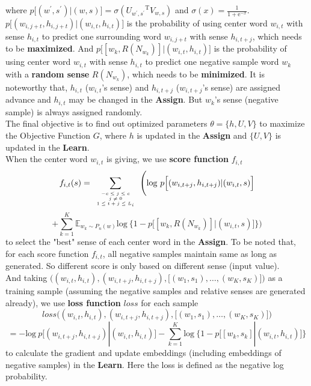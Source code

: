 \documentclass[12pt,a4paper,twoside]{book}
\begin{document}
where $p\Big[(w^\prime,s^\prime)|(w,s)\Big] = \sigma({U_{w^\prime,s^\prime}}^{\mathrm{T}}V_{w,s})$
 and $\sigma(x) = \frac{1}{1+\mathrm{e}^{-x}}$. \\
 
 $p\Big [(w_{i,j+t},h_{i,j+t})|(w_{i,t},h_{i,t})\Big ]$ is the probability of using center word $w_{i,t}$ with sense $h_{i,t}$ to predict one surrounding word $w_{i,j+t}$ with sense $h_{i,t+j}$, which needs to be \textbf{maximized}.
And $p\Big[[w_k,R(N_{w_k})]|(w_{i,t},h_{i,t})\Big ]$ is the probability of using center word $w_{i,t}$ with sense $h_{i,t}$ to predict one negative sample word $w_k$ with a \textbf{random sense} $R(N_{w_k})$, which needs to be \textbf{minimized}. 
It is noteworthy that, $h_{i,t}$  ($w_{i,t}$'s sense) and $h_{i,t+j}$ ($w_{i,t+j}$'s sense) are assigned advance and $h_{i,t}$ may be changed in the \textbf{Assign}. But $w_k$'s sense (negative sample) is always assigned randomly. \\

The final objective is to find out optimized parameters $\theta = \{h,U,V\}$ to maximize the Objective Function $G$, where $h$ is updated in the \textbf{Assign} and $\{U,V\}$ is updated in the \textbf{Learn}.\\

When the center word $w_{i,t}$ is giving, we use \textbf{score function} $f_{i,t}$
$$f_{i,t}(s) = \sum\limits_{\mbox{\tiny$\begin{array}{c}-c\leq j \leq c\\ j\neq 0\\ 1\leq t+j\leq L_i\end{array}$}}\Bigg (\mathrm{log}\ p\Big [(w_{i,t+j},h_{i,t+j})|(w_{i,t},s)\Big ]$$
$$+\sum\limits_{k=1}^K\mathbb{E}_{w_k\sim P_n(w)}\mathrm{log}\ \Big \{1-p\Big[[w_k,R(N_{w_k})]|(w_{i,t},s)\Big ] \Big \} \Bigg )$$
to select the "best" sense of each center word in the \textbf{Assign}. To be noted that, for each score function $f_{i,t}$, all negative samples maintain same as long as generated. So different score is only based on different sense (input value).\\

And taking $\big ( (w_{i,t},h_{i,t}),(w_{i,t+j},h_{i,t+j}),\big [(w_1,s_1),\ldots,(w_K,s_K)\big ]\big )$ as a training sample (assuming the negative samples and relative senses are generated already), we use \textbf{loss function} $loss$ for each sample 
$$loss\bigg ( (w_{i,t},h_{i,t}),(w_{i,t+j},h_{i,t+j}),\big [(w_1,s_1),\ldots,(w_K,s_K)\big ]\bigg )$$
$$ = -\mathrm{log}\ p\Big [(w_{i,t+j},h_{i,t+j})|(w_{i,t},h_{i,t})\Big ]-\sum\limits_{k=1}^K\mathrm{log}\ \Big \{1-p\Big[[w_k,s_k]|(w_{i,t},h_{i,t})\Big ] \Big \}$$
to calculate the gradient and update embeddings (including embeddings of negative samples) in the \textbf{Learn}. Here the loss is defined as the negative log probability. \\
\end{document}
